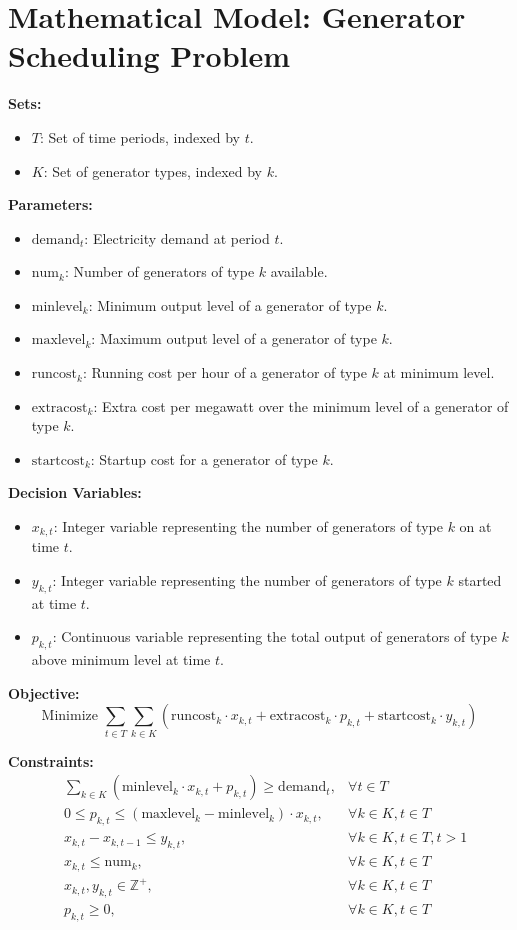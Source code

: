 \documentclass{article}
\begin{document}
\section*{Mathematical Model: Generator Scheduling Problem}

\textbf{Sets:}
\begin{itemize}
    \item $T$: Set of time periods, indexed by $t$.
    \item $K$: Set of generator types, indexed by $k$.
\end{itemize}

\textbf{Parameters:}
\begin{itemize}
    \item $\text{demand}_t$: Electricity demand at period $t$.
    \item $\text{num}_k$: Number of generators of type $k$ available.
    \item $\text{minlevel}_k$: Minimum output level of a generator of type $k$.
    \item $\text{maxlevel}_k$: Maximum output level of a generator of type $k$.
    \item $\text{runcost}_k$: Running cost per hour of a generator of type $k$ at minimum level.
    \item $\text{extracost}_k$: Extra cost per megawatt over the minimum level of a generator of type $k$.
    \item $\text{startcost}_k$: Startup cost for a generator of type $k$.
\end{itemize}

\textbf{Decision Variables:}
\begin{itemize}
    \item $x_{k,t}$: Integer variable representing the number of generators of type $k$ on at time $t$.
    \item $y_{k,t}$: Integer variable representing the number of generators of type $k$ started at time $t$.
    \item $p_{k,t}$: Continuous variable representing the total output of generators of type $k$ above minimum level at time $t$.
\end{itemize}

\textbf{Objective:}
\[
\text{Minimize } \sum_{t \in T} \sum_{k \in K} \left( \text{runcost}_k \cdot x_{k,t} + \text{extracost}_k \cdot p_{k,t} + \text{startcost}_k \cdot y_{k,t} \right)
\]

\textbf{Constraints:}
\begin{align}
    & \sum_{k \in K} \left( \text{minlevel}_k \cdot x_{k,t} + p_{k,t} \right) \geq \text{demand}_t, & \forall t \in T \\
    & 0 \leq p_{k,t} \leq (\text{maxlevel}_k - \text{minlevel}_k) \cdot x_{k,t}, & \forall k \in K, t \in T \\
    & x_{k,t} - x_{k,t-1} \leq y_{k,t}, & \forall k \in K, t \in T, t > 1 \\
    & x_{k,t} \leq \text{num}_k, & \forall k \in K, t \in T \\
    & x_{k,t}, y_{k,t} \in \mathbb{Z}^+, & \forall k \in K, t \in T \\
    & p_{k,t} \geq 0, & \forall k \in K, t \in T
\end{align}
\end{document}

